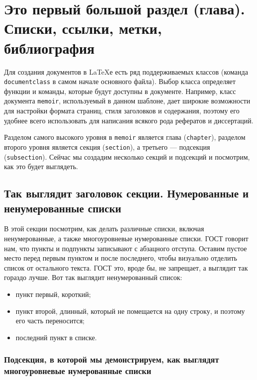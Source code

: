 \chapter{Это первый большой раздел (глава). Списки, ссылки, метки, библиография}
\thispagestyle{empty}
\label{ch:chap1}

    Для создания документов в \LaTeX{}е есть ряд поддерживаемых классов (команда \verb|documentclass| в самом начале основного файла). Выбор класса определяет функции и команды, которые будут доступны в документе. Например, класс документа \verb|memoir|, используемый в данном шаблоне, дает широкие возможности для настройки формата страниц, стиля заголовков и содержания, поэтому его удобнее всего использовать для написания всякого рода рефератов и диссертаций.

    Разделом самого высокого уровня в \verb|memoir| является глава (\verb|chapter|), разделом второго уровня является секция (\verb|section|), а третьего --- подсекция (\verb|subsection|). Сейчас мы создадим несколько секций и подсекций и посмотрим, как это будет выглядеть.

\section{Так выглядит заголовок секции. Нумерованные и ненумерованные списки}

    В этой секции посмотрим, как делать различные списки, включая ненумерованные, а также многоуровневые нумерованные списки. ГОСТ говорит нам, что пункты и подпункты записывают с абзацного отступа. Оставим пустое место перед первым пунктом и после последнего, чтобы визуально отделить список от остального текста. ГОСТ это, вроде бы, не запрещает, а выглядит так гораздо лучше. Вот так выглядит ненумерованный список:
    
    \begin{itemize}
        \item пункт первый, короткий;
        \item пункт второй, длинный, который не помещается на одну строку, и поэтому его часть переносится;
        \item последний пункт в списке.
    \end{itemize}
    
\subsection{Подсекция, в которой мы демонстрируем, как выглядят многоуровневые нумерованные списки}

